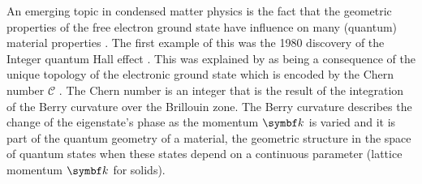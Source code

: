 \documentclass[../main.tex]{subfiles}
\begin{document}
An emerging topic in condensed matter physics is the fact that the geometric properties of the free electron ground state have influence on many (quantum) material properties \cite{yuQuantumGeometryQuantum2024, chengQuantumGeometricTensor2013}.
The first example of this was the 1980 discovery of the Integer quantum Hall effect \cite{klitzingNewMethodHighAccuracy1980}.
This was explained by \citeauthor{thoulessQuantizedHallConductance1982} as being a consequence of the unique topology of the electronic ground state which is encoded by the Chern number \(\mathcal{C}\) \cite{thoulessQuantizedHallConductance1982}.
The Chern number is an integer that is the result of the integration of the Berry curvature over the Brillouin zone.
The Berry curvature describes the change of the eigenstate's phase as the momentum \(\vb{k}\) is varied and it is part of the quantum geometry of a material, the geometric structure in the space of quantum states when these states depend on a continuous parameter (lattice momentum \(\vb{k}\) for solids).
\end{document}
